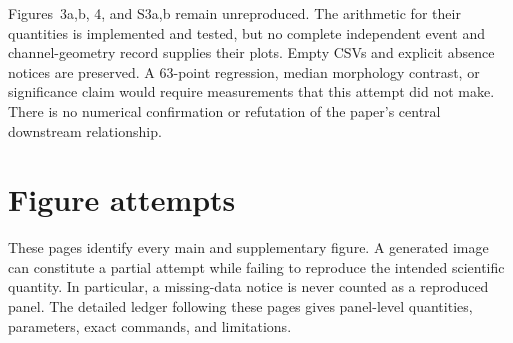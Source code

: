 \documentclass[11pt]{article}
\begin{document}
Figures~3a,b, 4, and S3a,b remain unreproduced. The arithmetic for their
quantities is implemented and tested, but no complete independent event and
channel-geometry record supplies their plots. Empty CSVs and explicit absence
notices are preserved. A 63-point regression, median morphology contrast,
or significance claim would require measurements that this attempt did not
make. There is no numerical confirmation or refutation of the paper's central
downstream relationship.

\clearpage
\section{Figure attempts}
These pages identify every main and supplementary figure. A generated image
can constitute a partial attempt while failing to reproduce the intended
scientific quantity. In particular, a missing-data notice is never counted
as a reproduced panel. The detailed ledger following these pages gives
panel-level quantities, parameters, exact commands, and limitations.
\end{document}
